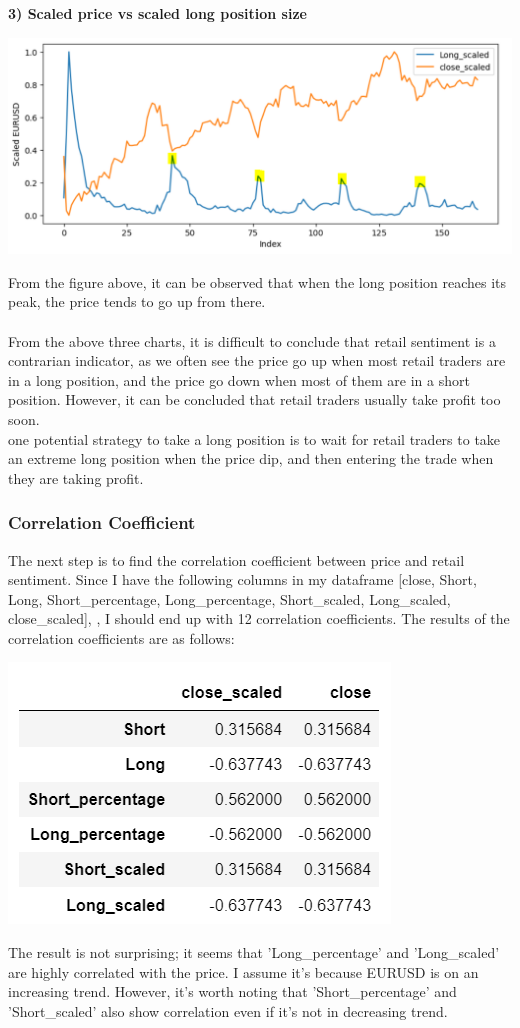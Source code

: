 \documentclass{article}
\begin{document}
\textbf{3) Scaled price vs scaled long position size}
\begin{center}
    \includegraphics[scale=0.7]{p4.png}    
\end{center}
From the figure above, it can be observed that when the long position reaches its peak, the price tends to go up from there.\\ \\

From the above three charts, it is difficult to conclude that retail sentiment is a contrarian indicator, as we often see the price go up when most retail traders are in a long position, and the price go down when most of them are in a short position. However, it can be concluded that retail traders usually take profit too soon. \\ 

one potential strategy to take a long position is to wait for retail traders to take an extreme long position when the price dip, and then entering the trade when they are taking profit.

\subsubsection{Correlation Coefficient}
The next step is to find the correlation coefficient between price and retail sentiment. Since I have the following columns in my dataframe [close, Short, Long, Short\_percentage, Long\_percentage, Short\_scaled, Long\_scaled, close\_scaled], , I should end up with 12 correlation coefficients. The results of the correlation coefficients are as follows:
\begin{center}
    \includegraphics[scale=0.7]{p5.png}    
\end{center}
The result is not surprising; it seems that 'Long\_percentage' and 'Long\_scaled' are highly correlated with the price. I assume it's because EURUSD is on an increasing trend. However, it's worth noting that 'Short\_percentage' and 'Short\_scaled' also show correlation even if it's not in decreasing trend.
\end{document}
